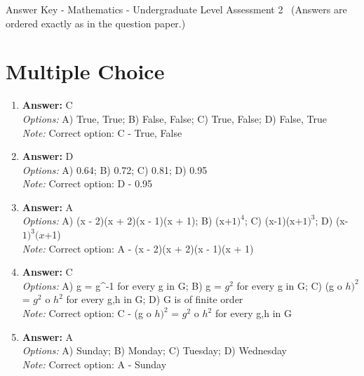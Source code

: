 \documentclass[12pt]{article}
\begin{document}
\begin{center}
Answer Key - Mathematics - Undergraduate Level Assessment 2 \
\small (Answers are ordered exactly as in the question paper.)
\end{center}

\section*{Multiple Choice}
\begin{enumerate}[label=\arabic*.]
\item \textbf{Answer:} C
\\ \textit{Options:} A) True, True; B) False, False; C) True, False; D) False, True
\\ \textit{Note:} Correct option: C - True, False
\item \textbf{Answer:} D
\\ \textit{Options:} A) 0.64; B) 0.72; C) 0.81; D) 0.95
\\ \textit{Note:} Correct option: D - 0.95
\item \textbf{Answer:} A
\\ \textit{Options:} A) (x - 2)(x + 2)(x - 1)(x + 1); B) (x+$1)^4$; C) (x-1)(x+$1)^3$; D) (x-$1)^3(x$+1)
\\ \textit{Note:} Correct option: A - (x - 2)(x + 2)(x - 1)(x + 1)
\item \textbf{Answer:} C
\\ \textit{Options:} A) g = g^-1 for every g in G; B) g = $g^2$ for every g in G; C) (g o $h)^2$ = $g^2$ o $h^2$ for every g,h in G; D) G is of finite order
\\ \textit{Note:} Correct option: C - (g o $h)^2$ = $g^2$ o $h^2$ for every g,h in G
\item \textbf{Answer:} A
\\ \textit{Options:} A) Sunday; B) Monday; C) Tuesday; D) Wednesday
\\ \textit{Note:} Correct option: A - Sunday
\end{enumerate}
\end{document}
